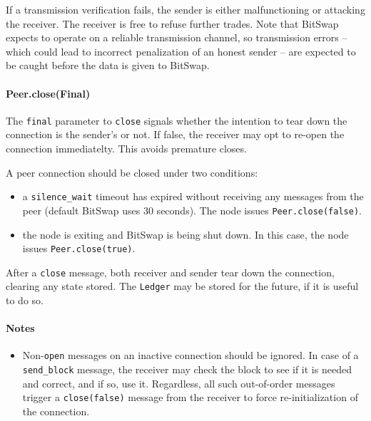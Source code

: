 \documentclass{sig-alternate}
\begin{document}
If a transmission verification fails, the sender is either malfunctioning or
attacking the receiver. The receiver is free to refuse further trades. Note
that BitSwap expects to operate on a reliable transmission channel, so
transmission errors -- which could lead to incorrect penalization of an honest
sender -- are expected to be caught before the data is given to BitSwap.

\paragraph{Peer.close(Final)}

The \texttt{final} parameter to \texttt{close} signals whether the intention
to tear down the connection is the sender's or not. If false, the receiver
may opt to re-open the connection immediatelty. This avoids premature
closes.

A peer connection should be closed under two conditions:
\begin{itemize}
  \item a \texttt{silence\_wait} timeout has expired without receiving any
        messages from the peer (default BitSwap uses 30 seconds).
        The node issues \texttt{Peer.close(false)}.
  \item the node is exiting and BitSwap is being shut down.
        In this case, the node issues \texttt{Peer.close(true)}.
\end{itemize}

After a \texttt{close} message, both receiver and sender tear down the
connection, clearing any state stored. The \texttt{Ledger} may be stored for
the future, if it is useful to do so.

\paragraph{Notes}

\begin{itemize}
  \item Non-\texttt{open} messages on an inactive connection should be ignored.
        In case of a \texttt{send\_block} message, the receiver may check
        the block to see if it is needed and correct, and if so, use it.
        Regardless, all such out-of-order messages trigger a
        \texttt{close(false)} message from the receiver to force
        re-initialization of the connection.
\end{itemize}

\end{document}
